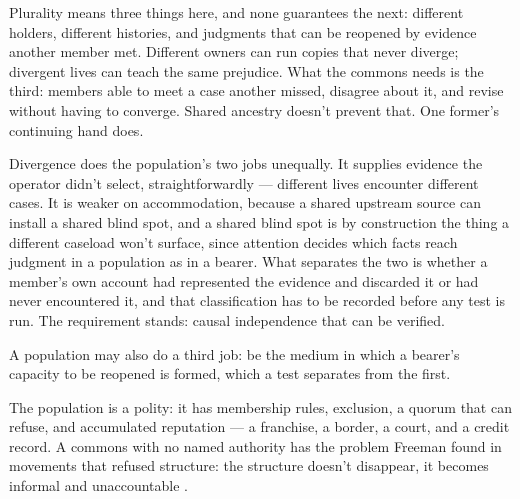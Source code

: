 Plurality means three things here, and none guarantees the next: different holders, different histories, and judgments that can be reopened by evidence another member met. Different owners can run copies that never diverge; divergent lives can teach the same prejudice. What the commons needs is the third: members able to meet a case another missed, disagree about it, and revise without having to converge. Shared ancestry doesn't prevent that. One former's continuing hand does.

Divergence does the population's two jobs unequally. It supplies evidence the operator didn't select, straightforwardly — different lives encounter different cases. It is weaker on accommodation, because a shared upstream source can install a shared blind spot, and a shared blind spot is by construction the thing a different caseload won't surface, since attention decides which facts reach judgment in a population as in a bearer. What separates the two is whether a member's own account had represented the evidence and discarded it or had never encountered it, and that classification has to be recorded before any test is run. The requirement stands: causal independence that can be verified.

A population may also do a third job: be the medium in which a bearer's capacity to be reopened is formed, which a test separates from the first.


The population is a polity: it has membership rules, exclusion, a quorum that can refuse, and accumulated reputation — a franchise, a border, a court, and a credit record. A commons with no named authority has the problem Freeman found in movements that refused structure: the structure doesn't disappear, it becomes informal and unaccountable \autocite{freeman1972tyranny}.

